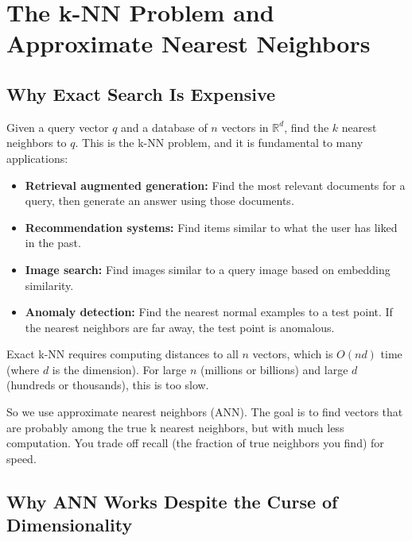 \vspace{2em}

\section{The k-NN Problem and Approximate Nearest Neighbors}

\subsection{Why Exact Search Is Expensive}

Given a query vector $q$ and a database of $n$ vectors in $\mathbb{R}^d$, find the $k$ nearest neighbors to $q$. This is the k-NN problem, and it is fundamental to many applications:

\begin{itemize}
\item \textbf{Retrieval augmented generation:} Find the most relevant documents for a query, then generate an answer using those documents.

\item \textbf{Recommendation systems:} Find items similar to what the user has liked in the past.

\item \textbf{Image search:} Find images similar to a query image based on embedding similarity.

\item \textbf{Anomaly detection:} Find the nearest normal examples to a test point. If the nearest neighbors are far away, the test point is anomalous.
\end{itemize}


Exact k-NN requires computing distances to all $n$ vectors, which is $O(nd)$ time (where $d$ is the dimension). For large $n$ (millions or billions) and large $d$ (hundreds or thousands), this is too slow.

So we use approximate nearest neighbors (ANN). The goal is to find vectors that are probably among the true k nearest neighbors, but with much less computation. You trade off recall (the fraction of true neighbors you find) for speed.

\vspace{1.5em}

\subsection{Why ANN Works Despite the Curse of Dimensionality}

